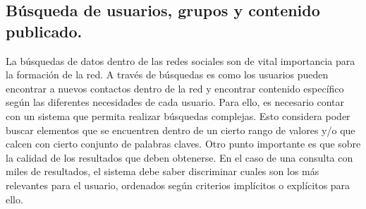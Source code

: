     
    
    

\subsection{Búsqueda de usuarios, grupos y contenido publicado.}
\label{sec:busqueda}
    La búsquedas de datos dentro de las redes sociales  son de vital importancia para la formación de la
    red. A través de búsquedas es como los usuarios
    pueden encontrar a nuevos contactos dentro de la red y encontrar contenido
    específico según las diferentes necesidades de cada usuario.  Para ello, es
    necesario contar con un sistema que permita realizar búsquedas complejas.
    Esto considera poder buscar elementos que se encuentren dentro de un cierto
    rango de valores y/o que calcen con cierto conjunto de palabras claves.
    Otro punto importante es que sobre la calidad de los resultados que deben
    obtenerse. En el caso de una consulta con miles de resultados, el sistema
    debe saber discriminar cuales son los más relevantes para el usuario, ordenados
    según criterios implícitos o explícitos para ello.


